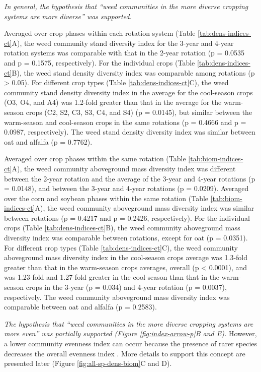 \documentclass[
]{article}
\begin{document}
\emph{In general, the hypothesis that ``weed communities in the more diverse cropping systems are more diverse'' was supported.}

Averaged over crop phases within each rotation system (Table \ref{tab:dens-indices-ct}A), the weed community stand diversity index for the 3-year and 4-year rotation systems was comparable with that in the 2-year rotation (p = 0.0535 and p = 0.1575, respectively). For the individual crops (Table \ref{tab:dens-indices-ct}B), the weed stand density diversity index was comparable among rotations (p \textgreater{} 0.05). For different crop types (Table \ref{tab:dens-indices-ct}C), the weed community stand density diversity index in the average for the cool-season crops (O3, O4, and A4) was 1.2-fold greater than that in the average for the warm-season crops (C2, S2, C3, S3, C4, and S4) (p = 0.0145), but similar between the warm-season and cool-season crops in the same rotations (p = 0.4666 and p = 0.0987, respectively). The weed stand density diversity index was similar between oat and alfalfa (p = 0.7762).

Averaged over crop phases within the same rotation (Table \ref{tab:biom-indices-ct}A), the weed community aboveground mass diversity index was different between the 2-year rotation and the average of the 3-year and 4-year rotations (p = 0.0148), and between the 3-year and 4-year rotations (p = 0.0209). Averaged over the corn and soybean phases within the same rotation (Table \ref{tab:biom-indices-ct}A), the weed community aboveground mass diversity index was similar between rotations (p = 0.4217 and p = 0.2426, respectively). For the individual crops (Table \ref{tab:dens-indices-ct}B), the weed community aboveground mass diversity index was comparable between rotations, except for oat (p = 0.0351). For different crop types (Table \ref{tab:dens-indices-ct}C), the weed community aboveground mass diversity index in the cool-season crops average was 1.3-fold greater than that in the warm-season crops averages, overall (p \textless{} 0.0001), and was 1.23-fold and 1.27-fold greater in the cool-season than that in the warm-season crops in the 3-year (p = 0.034) and 4-year rotation (p = 0.0037), respectively. The weed community aboveground mass diversity index was comparable between oat and alfalfa (p = 0.2583).

\emph{The hypothesis that ``weed communities in the more diverse cropping systems are more even'' was partially supported (Figure \ref{fig:index-arrow-p}B and E).} However, a lower community evenness index can occur because the presence of rarer species decreases the overall evenness index \citep{stirlingEmpiricalRelationshipsSpecies2001}. More details to support this concept are presented later (Figure \ref{fig:all-sp-dens-biom}C and D).
\end{document}
